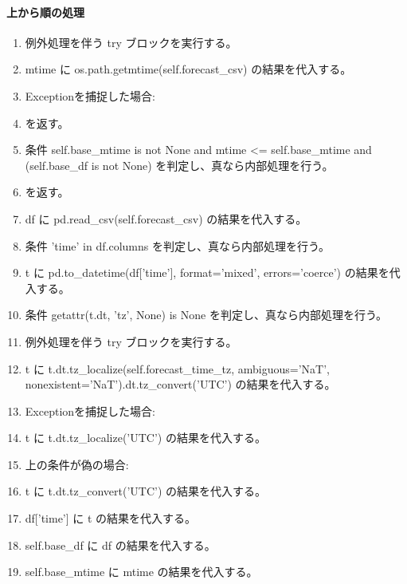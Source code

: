 \documentclass[a4paper,11pt]{article}
\begin{document}
            \paragraph{上から順の処理}
            \begin{enumerate}[leftmargin=1.8em]
            \item 例外処理を伴う try ブロックを実行する。
\item   mtime に os.path.getmtime(self.forecast\_csv) の結果を代入する。
\item   Exceptionを捕捉した場合:
\item    を返す。
\item 条件 self.base\_mtime is not None and mtime <= self.base\_mtime and (self.base\_df is not None) を判定し、真なら内部処理を行う。
\item    を返す。
\item df に pd.read\_csv(self.forecast\_csv) の結果を代入する。
\item 条件 'time' in df.columns を判定し、真なら内部処理を行う。
\item   t に pd.to\_datetime(df['time'], format='mixed', errors='coerce') の結果を代入する。
\item   条件 getattr(t.dt, 'tz', None) is None を判定し、真なら内部処理を行う。
\item     例外処理を伴う try ブロックを実行する。
\item       t に t.dt.tz\_localize(self.forecast\_time\_tz, ambiguous='NaT', nonexistent='NaT').dt.tz\_convert('UTC') の結果を代入する。
\item       Exceptionを捕捉した場合:
\item       t に t.dt.tz\_localize('UTC') の結果を代入する。
\item     上の条件が偽の場合:
\item     t に t.dt.tz\_convert('UTC') の結果を代入する。
\item   df['time'] に t の結果を代入する。
\item self.base\_df に df の結果を代入する。
\item self.base\_mtime に mtime の結果を代入する。
            \end{enumerate}
\end{document}
